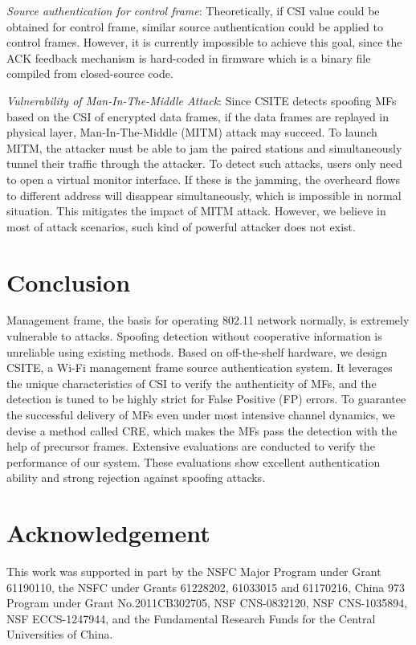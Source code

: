 \documentclass[conference]{IEEEtran}
\begin{document}
\textit{Source authentication for control frame}: Theoretically, if CSI value could be obtained for control frame, similar source authentication could be applied to control frames. However, it is currently impossible to achieve this goal, since the ACK feedback mechanism is hard-coded in firmware which is a binary file compiled from closed-source code.

\textit{Vulnerability of Man-In-The-Middle Attack}:
Since CSITE detects spoofing MFs based on the CSI of encrypted data frames, if the data frames are replayed in physical layer, Man-In-The-Middle (MITM) attack may succeed. To launch MITM, the attacker must be able to jam the paired stations and simultaneously tunnel their traffic through the attacker. To detect such attacks, users only need to open a virtual monitor interface. If these is the jamming, the overheard flows to different address will disappear simultaneously, which is impossible in normal situation. This mitigates the impact of MITM attack. However, we believe in most of attack scenarios, such kind of powerful attacker does not exist.

\section{Conclusion}
\label{sec:conclusion}


Management frame, the basis for operating 802.11 network normally, is extremely vulnerable to attacks.
Spoofing detection without cooperative information is unreliable using existing methods. Based on off-the-shelf hardware, we design CSITE, a Wi-Fi management frame source authentication system.
It leverages the unique characteristics of CSI to verify the authenticity of MFs, and the detection is tuned to be highly strict for False Positive (FP) errors.
To guarantee the successful delivery of MFs even under most intensive channel dynamics, we devise a method called CRE, which makes the MFs pass the detection with the help of precursor frames.
Extensive evaluations are conducted to verify the performance of our system. These evaluations show excellent authentication ability and strong rejection against spoofing attacks.




\section*{Acknowledgement}
This work was supported in part by the NSFC Major Program under Grant 61190110, the NSFC under Grants 61228202, 61033015 and 61170216, China 973 Program under Grant No.2011CB302705, NSF CNS-0832120, NSF CNS-1035894, NSF ECCS-1247944, and the Fundamental Research Funds for the Central Universities of China.



\end{document}
